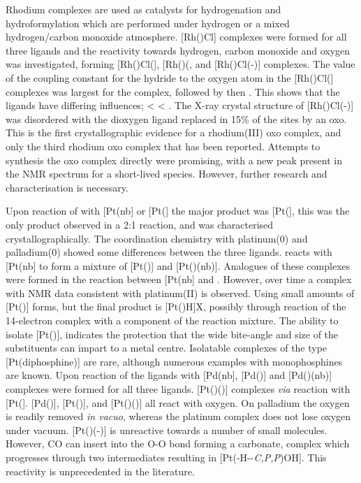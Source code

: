 Rhodium complexes are used as catalysts for hydrogenation and hydroformylation which are performed under hydrogen or a mixed hydrogen/carbon monoxide atmosphere.  [Rh(\tBuxantphosk)Cl] complexes were formed for all three \tBuxantphos{} ligands and the reactivity towards hydrogen, carbon monoxide and oxygen was investigated, forming [Rh(\tBuxantphosk)Cl(], [Rh(\tBuxantphos)(\ce{CO)2Cl]}, and [Rh(\tBuxantphosk)Cl(-)] complexes.  The value of the \JRhH{} coupling constant for the hydride \trans{} to the oxygen atom in the [Rh(\tBuxantphosk)Cl(] complexes was largest for the \tBusixantphos{} complex, followed by \tButhixantphos{} then \tBuxantphos{}.  This shows that the ligands have differing \trans{} influences; \tBuxantphos{} \textless{} \tButhixantphos{} \textless{} \tBusixantphos.  The X-ray crystal structure of [Rh(\tBuxantphosk)Cl(-)] was disordered with the dioxygen ligand replaced in 15\% of the sites by an oxo.  This is the first crystallographic evidence for a rhodium(III) oxo complex, and only the third rhodium oxo complex that has been reported.  Attempts to synthesis the oxo complex directly were promising, with a new peak present in the \phosphorus{} NMR spectrum for a short-lived species.  However, further research and characterisation is necessary.

Upon reaction of \Phthixantphos{} with [Pt(nb] or [Pt(] the major product was [Pt(\Phthixantphos{}], this was the only product observed in a 2:1 reaction, and was characterised crystallographically.  The coordination chemistry with platinum(0) and palladium(0) showed some differences between the three \tBuxantphos{} ligands.  \tBuThixantphos{} reacts with [Pt(nb] to form a mixture of [Pt(\tButhixantphos)] and [Pt(\tButhixantphos)(nb)].  Analogues of these complexes were formed in the reaction between [Pt(nb] and \tBusixantphos{}.  However, over time a complex with NMR data consistent with platinum(II) is observed.  Using \tBuxantphos{} small amounts of [Pt(\tBuxantphos)] forms, but the final product is [Pt(\tBuxantphos)H]X, possibly through reaction of the 14-electron complex with a component of the reaction mixture.  The ability to isolate [Pt(\tButhixantphos)], indicates the protection that the wide bite-angle and size of the \tBu{} substituents can impart to a metal centre.  Isolatable complexes of the type [Pt(diphosphine)] are rare, although numerous examples with monophosphines are known.  Upon reaction of the \tBuxantphos{} ligands with [Pd(nb], [Pd(\tBuxantphos)] and [Pd(\tBuxantphos)(nb)] complexes were formed for all three ligands.  [Pt(\tBuxantphos)()] complexes \emph{via} reaction with [Pt(].  [Pd(\tButhixantphos)], [Pt(\tButhixantphos)], and [Pt(\tButhixantphos)()] all react with oxygen.  On palladium the oxygen is readily removed \emph{in vacuo}, whereas the platinum complex does not lose oxygen under vacuum.  [Pt(\tButhixantphos)(-)] is unreactive towards  a number of small molecules.  However, CO can insert into the O-O bond forming a carbonate, complex which progresses through two intermediates resulting in [Pt(\tButhixantphos-H-\dento{}-\emph{C,P,P}\textprime)OH].  This reactivity is unprecedented in the literature.  

